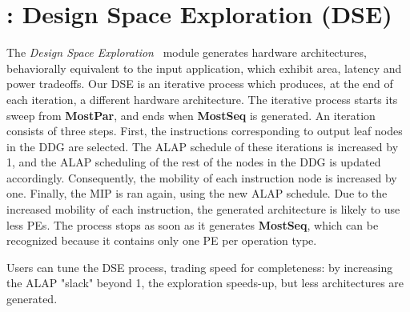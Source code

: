 \section{\frameworkname: Design Space Exploration (DSE)}
\label{ssec:dse}
The \textit{Design Space Exploration} \frameworkname~module generates hardware architectures, behaviorally equivalent to the input application, which exhibit area, latency and power tradeoffs.
Our DSE is an iterative process which produces, at the end of each iteration, a different hardware architecture.
The iterative process starts its sweep from \textbf{MostPar}, and ends when \textbf{MostSeq} is generated.
An iteration consists of three steps. First, the instructions corresponding to output leaf nodes in the DDG are selected. The ALAP schedule of these iterations is increased by 1, and the ALAP scheduling of the rest of the nodes in the DDG is updated accordingly. Consequently, the mobility of each instruction node is increased by one. Finally, the MIP is ran again, using the new ALAP schedule. Due to the increased mobility of each instruction, the generated architecture is likely to use less PEs.
The process stops as soon as it generates \textbf{MostSeq}, which can be recognized because it contains only one PE per operation type.

Users can tune the DSE process, trading speed for completeness: by increasing the ALAP "slack" beyond 1, the exploration speeds-up, but less architectures are generated.

